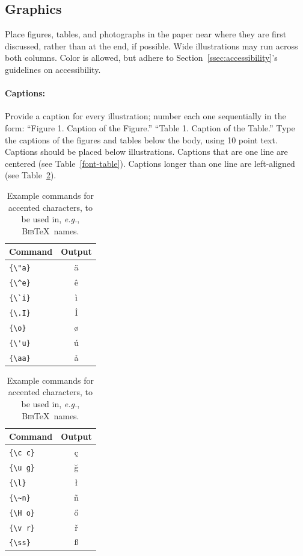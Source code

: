 \documentclass[11pt,a4paper]{article}
\newcommand\BibTeX{B\textsc{ib}\TeX}
\begin{document}
\subsection{Graphics}

Place figures, tables, and photographs in the paper near where they are first discussed, rather than at the end, if possible.
Wide illustrations may run across both columns.
Color is allowed, but adhere to Section~\ref{ssec:accessibility}'s guidelines on accessibility.

\paragraph{Captions:}
Provide a caption for every illustration; number each one sequentially in the form:
``Figure 1. Caption of the Figure.''
``Table 1. Caption of the Table.''
Type the captions of the figures and tables below the body, using 10 point text.
Captions should be placed below illustrations.
Captions that are one line are centered (see Table~\ref{font-table}).
Captions longer than one line are left-aligned (see Table~\ref{tab:accents}).

\begin{table}
\centering
\begin{tabular}{lc}
\hline
\textbf{Command} & \textbf{Output}\\
\hline
\verb|{\"a}| & {\"a} \\
\verb|{\^e}| & {\^e} \\
\verb|{\`i}| & {\`i} \\ 
\verb|{\.I}| & {\.I} \\ 
\verb|{\o}| & {\o} \\
\verb|{\'u}| & {\'u}  \\ 
\verb|{\aa}| & {\aa}  \\\hline
\end{tabular}
\begin{tabular}{lc}
\hline
\textbf{Command} & \textbf{Output}\\
\hline
\verb|{\c c}| & {\c c} \\ 
\verb|{\u g}| & {\u g} \\ 
\verb|{\l}| & {\l} \\ 
\verb|{\~n}| & {\~n} \\ 
\verb|{\H o}| & {\H o} \\ 
\verb|{\v r}| & {\v r} \\ 
\verb|{\ss}| & {\ss} \\
\hline
\end{tabular}
\caption{Example commands for accented characters, to be used in, \emph{e.g.}, \BibTeX\ names.}\label{tab:accents}
\end{table}
\end{document}
